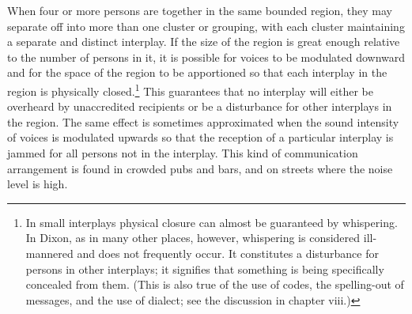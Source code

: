 \documentclass[openany,nobib]{tufte-book}
\begin{document}
When four or more persons are together in the same bounded region, they
may separate off into more than one cluster or grouping, with each
cluster maintaining a separate and distinct interplay. If the size of
the region is great enough relative to the number of persons in it, it
is possible for voices to be modulated downward and for the space of the
region to be apportioned so that each interplay in the region is
physically closed.\footnote{In small interplays physical closure can
  almost be guaranteed by whispering. In Dixon, as in many other places,
  however, whispering is considered ill-mannered and does not frequently
  occur. It constitutes a disturbance for persons in other interplays;
  it signifies that something is being specifically concealed from them.
  (This is also true of the use of codes, the spelling-out of messages,
  and the use of dialect; see the discussion in chapter viii.)} This
guarantees that no interplay will either be overheard by unaccredited
recipients or be a disturbance for other interplays in the region. The
same effect is sometimes approximated when the sound intensity of voices
is modulated upwards so that the reception of a particular interplay is
jammed for all persons not in the interplay. This kind of communication
arrangement is found in crowded pubs and bars, and on streets where the
noise level is high.
\end{document}

